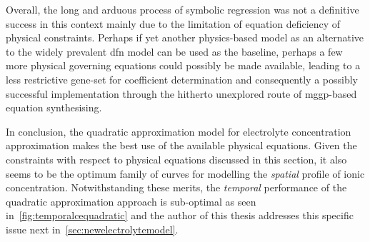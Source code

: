 Overall,  the  long  and  arduous  process of  symbolic  regression  was  not  a
definitive success  in this  context mainly  due to  the limitation  of equation
deficiency of physical  constraints. Perhaps if yet  another physics-based model
as an  alternative to the  widely prevalent \gls{dfn} model  can be used  as the
baseline, perhaps a few more physical governing equations could possibly be made
available, leading to a less  restrictive gene-set for coefficient determination
and  consequently  a possibly  successful  implementation  through the  hitherto
unexplored  route of  \gls{mggp}-based  equation synthesising.

In conclusion,  the quadratic approximation model  for electrolyte concentration
approximation makes the best use of  the available physical equations. Given the
constraints  with  respect to  physical  equations  discussed in  this  section,
it  also  seems   to  be  the  optimum  family  of   curves  for  modelling  the
\emph{spatial}  profile of  ionic concentration.  Notwithstanding these  merits,
the  \emph{temporal}  performance of  the  quadratic  approximation approach  is
sub-optimal  as seen  in~\cref{fig:temporalcequadratic} and  the author  of this
thesis addresses this specific issue next in~\cref{sec:newelectrolytemodel}.

